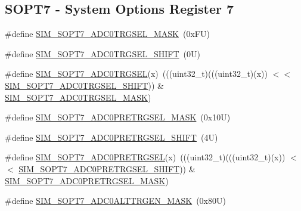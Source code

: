 \subsection*{S\+O\+P\+T7 -\/ System Options Register 7}
\begin{DoxyCompactItemize}
\item 
\#define \mbox{\hyperlink{group___s_i_m___register___masks_gaeda70babef834cacace2c775d62bb4ae}{S\+I\+M\+\_\+\+S\+O\+P\+T7\+\_\+\+A\+D\+C0\+T\+R\+G\+S\+E\+L\+\_\+\+M\+A\+SK}}~(0x\+F\+U)
\item 
\#define \mbox{\hyperlink{group___s_i_m___register___masks_ga914ced2a5cf4e7f37371d52d34d4a930}{S\+I\+M\+\_\+\+S\+O\+P\+T7\+\_\+\+A\+D\+C0\+T\+R\+G\+S\+E\+L\+\_\+\+S\+H\+I\+FT}}~(0\+U)
\item 
\#define \mbox{\hyperlink{group___s_i_m___register___masks_gab4fec73a0cfeecaa863fc29f85326f4a}{S\+I\+M\+\_\+\+S\+O\+P\+T7\+\_\+\+A\+D\+C0\+T\+R\+G\+S\+EL}}(x)~(((uint32\+\_\+t)(((uint32\+\_\+t)(x)) $<$$<$ \mbox{\hyperlink{group___s_i_m___register___masks_ga914ced2a5cf4e7f37371d52d34d4a930}{S\+I\+M\+\_\+\+S\+O\+P\+T7\+\_\+\+A\+D\+C0\+T\+R\+G\+S\+E\+L\+\_\+\+S\+H\+I\+FT}})) \& \mbox{\hyperlink{group___s_i_m___register___masks_gaeda70babef834cacace2c775d62bb4ae}{S\+I\+M\+\_\+\+S\+O\+P\+T7\+\_\+\+A\+D\+C0\+T\+R\+G\+S\+E\+L\+\_\+\+M\+A\+SK}})
\item 
\#define \mbox{\hyperlink{group___s_i_m___register___masks_ga74544c6c9d4fbc593884681ac79c796f}{S\+I\+M\+\_\+\+S\+O\+P\+T7\+\_\+\+A\+D\+C0\+P\+R\+E\+T\+R\+G\+S\+E\+L\+\_\+\+M\+A\+SK}}~(0x10\+U)
\item 
\#define \mbox{\hyperlink{group___s_i_m___register___masks_gaee870f942318f14376ee9e6d5558e2ff}{S\+I\+M\+\_\+\+S\+O\+P\+T7\+\_\+\+A\+D\+C0\+P\+R\+E\+T\+R\+G\+S\+E\+L\+\_\+\+S\+H\+I\+FT}}~(4\+U)
\item 
\#define \mbox{\hyperlink{group___s_i_m___register___masks_ga32aad79c431ab427d548f59637f16e76}{S\+I\+M\+\_\+\+S\+O\+P\+T7\+\_\+\+A\+D\+C0\+P\+R\+E\+T\+R\+G\+S\+EL}}(x)~(((uint32\+\_\+t)(((uint32\+\_\+t)(x)) $<$$<$ \mbox{\hyperlink{group___s_i_m___register___masks_gaee870f942318f14376ee9e6d5558e2ff}{S\+I\+M\+\_\+\+S\+O\+P\+T7\+\_\+\+A\+D\+C0\+P\+R\+E\+T\+R\+G\+S\+E\+L\+\_\+\+S\+H\+I\+FT}})) \& \mbox{\hyperlink{group___s_i_m___register___masks_ga74544c6c9d4fbc593884681ac79c796f}{S\+I\+M\+\_\+\+S\+O\+P\+T7\+\_\+\+A\+D\+C0\+P\+R\+E\+T\+R\+G\+S\+E\+L\+\_\+\+M\+A\+SK}})
\item 
\#define \mbox{\hyperlink{group___s_i_m___register___masks_ga6390cd75db35ecc6c5fc6d5b0d417a7d}{S\+I\+M\+\_\+\+S\+O\+P\+T7\+\_\+\+A\+D\+C0\+A\+L\+T\+T\+R\+G\+E\+N\+\_\+\+M\+A\+SK}}~(0x80\+U)

\end{DoxyCompactItemize}
